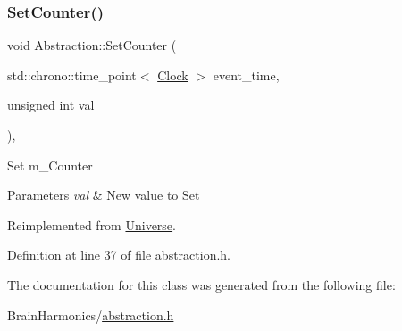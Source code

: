 \subsubsection{\texorpdfstring{Set\+Counter()}{SetCounter()}}
{\footnotesize\ttfamily void Abstraction\+::\+Set\+Counter (\begin{DoxyParamCaption}\item[{std\+::chrono\+::time\+\_\+point$<$ \hyperlink{universe_8h_a0ef8d951d1ca5ab3cfaf7ab4c7a6fd80}{Clock} $>$}]{event\+\_\+time,  }\item[{unsigned int}]{val }\end{DoxyParamCaption})\hspace{0.3cm}{\ttfamily [inline]}, {\ttfamily [virtual]}}

Set m\+\_\+\+Counter 
\begin{DoxyParams}{Parameters}
{\em val} & New value to Set \\
\hline
\end{DoxyParams}


Reimplemented from \hyperlink{class_universe_aa22202ae740eb1355529afcb13285e91}{Universe}.



Definition at line 37 of file abstraction.\+h.



The documentation for this class was generated from the following file\+:\begin{DoxyCompactItemize}
\item 
Brain\+Harmonics/\hyperlink{abstraction_8h}{abstraction.\+h}\end{DoxyCompactItemize}
